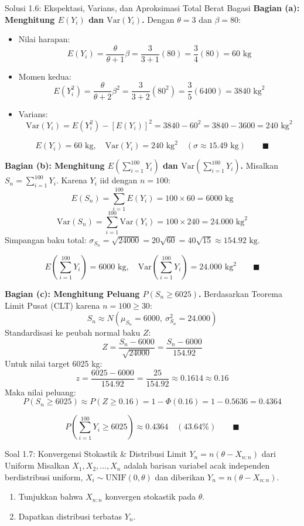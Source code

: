 \documentclass[10pt,twoside]{article}
\begin{document}
\begin{solbox}{Solusi 1.6: Ekspektasi, Varians, dan Aproksimasi Total Berat Bagasi}
\textbf{Bagian (a): Menghitung $E(Y_i)$ dan $\mathrm{Var}(Y_i)$.}
Dengan $\theta = 3$ dan $\beta = 80$:
\begin{itemize}
  \item Nilai harapan:
  \[
  E(Y_i) = \frac{\theta}{\theta+1}\beta = \frac{3}{3+1}(80) = \frac{3}{4}(80) = 60 \text{ kg}
  \]
  \item Momen kedua:
  \[
  E(Y_i^2) = \frac{\theta}{\theta+2}\beta^2 = \frac{3}{3+2}(80^2) = \frac{3}{5}(6400) = 3840 \text{ kg}^2
  \]
  \item Varians:
  \[
  \mathrm{Var}(Y_i) = E(Y_i^2) - [E(Y_i)]^2 = 3840 - 60^2 = 3840 - 3600 = 240 \text{ kg}^2
  \]
\end{itemize}

\[
\boxed{E(Y_i) = 60 \text{ kg}, \quad \mathrm{Var}(Y_i) = 240 \text{ kg}^2 \quad (\sigma \approx 15.49 \text{ kg})} \qquad \blacksquare
\]

\textbf{Bagian (b): Menghitung $E\left(\sum_{i=1}^{100}Y_i\right)$ dan $\mathrm{Var}\left(\sum_{i=1}^{100}Y_i\right)$.}
Misalkan $S_n = \sum_{i=1}^{100} Y_i$. Karena $Y_i$ iid dengan $n = 100$:
\[
E(S_n) = \sum_{i=1}^{100} E(Y_i) = 100 \times 60 = 6000 \text{ kg}
\]
\[
\mathrm{Var}(S_n) = \sum_{i=1}^{100} \mathrm{Var}(Y_i) = 100 \times 240 = 24.000 \text{ kg}^2
\]
Simpangan baku total: $\sigma_{S_n} = \sqrt{24000} = 20\sqrt{60} = 40\sqrt{15} \approx 154.92 \text{ kg}$.

\[
\boxed{E\left(\sum_{i=1}^{100}Y_i\right) = 6000 \text{ kg}, \quad \mathrm{Var}\left(\sum_{i=1}^{100}Y_i\right) = 24.000 \text{ kg}^2} \qquad \blacksquare
\]

\textbf{Bagian (c): Menghitung Peluang $P(S_n \ge 6025)$.}
Berdasarkan Teorema Limit Pusat (CLT) karena $n = 100 \ge 30$:
\[
S_n \approx N(\mu_{S_n} = 6000, \ \sigma_{S_n}^2 = 24.000)
\]
Standardisasi ke peubah normal baku $Z$:
\[
Z = \frac{S_n - 6000}{\sqrt{24000}} = \frac{S_n - 6000}{154.92}
\]
Untuk nilai target 6025 kg:
\[
z = \frac{6025 - 6000}{154.92} = \frac{25}{154.92} \approx 0.1614 \approx 0.16
\]
Maka nilai peluang:
\[
P(S_n \ge 6025) \approx P(Z \ge 0.16) = 1 - \Phi(0.16) = 1 - 0.5636 = 0.4364
\]

\[
\boxed{P\left(\sum_{i=1}^{100} Y_i \ge 6025\right) \approx 0.4364 \quad (43.64\%)} \qquad \blacksquare
\]
\end{solbox}

\begin{soalbox}{Soal 1.7: Konvergensi Stokastik \& Distribusi Limit $Y_n = n(\theta - X_{n:n})$ dari Uniform}
Misalkan $X_1, X_2, \dots, X_n$ adalah barisan variabel acak independen berdistribusi uniform, $X_i \sim \text{UNIF}(0,\theta)$ dan diberikan $Y_n = n(\theta - X_{n:n})$.
\begin{enumerate}[label=(\alph*)]
  \item Tunjukkan bahwa $X_{n:n}$ konvergen stokastik pada $\theta$.
  \item Dapatkan distribusi terbatas $Y_n$.
\end{enumerate}
\end{soalbox}
\end{document}
